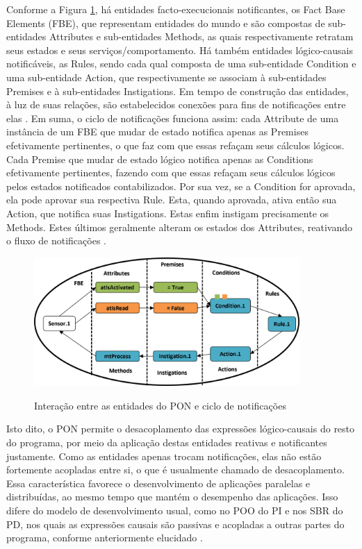 Conforme a Figura \ref{fig:oshiro_pon}, há entidades facto-execucionais
notificantes, os Fact Base Elements (FBE), que representam entidades do mundo e
são compostas de sub-entidades Attributes e sub-entidades Methods, as quais
respectivamente retratam seus estados e seus serviços/comportamento. Há também
entidades lógico-causais notificáveis, as Rules, sendo cada qual composta de uma
sub-entidade Condition e uma sub-entidade Action, que respectivamente se
associam à sub-entidades Premises e à sub-entidades Instigations. Em tempo de
construção das entidades, à luz de suas relações, são estabelecidos conexões
para fins de notificações entre elas \cite{doc_ronszcka_2019,oshiro_2021}. Em
suma, o ciclo de notificações funciona assim: cada Attribute de uma instância de
um FBE que mudar de estado notifica apenas as Premises efetivamente pertinentes,
o que faz com que essas refaçam seus cálculos lógicos. Cada Premise que mudar de
estado lógico notifica apenas as Conditions efetivamente pertinentes, fazendo
com que essas refaçam seus cálculos lógicos pelos estados notificados
contabilizados. Por sua vez, se a Condition for aprovada, ela pode aprovar sua
respectiva Rule. Esta, quando aprovada, ativa então sua Action, que notifica
suas Instigations. Estas enfim instigam precisamente os Methods. Estes últimos
geralmente alteram os estados dos Attributes, reativando o fluxo de notificações
\cite{doc_ronszcka_2019,oshiro_2021}.

\begin{figure}[!htb]
  \centering
  \caption{Interação entre as entidades do PON e ciclo de notificações}
  \includegraphics[width=0.9\textwidth]{../figures/nop_cycle.png}
  \smallskip
  \label{fig:oshiro_pon}
\end{figure}

Isto dito, o PON permite o desacoplamento das expressões lógico-causais do resto
do programa, por meio da aplicação destas entidades reativas e notificantes
justamente. Como as entidades apenas trocam notificações, elas não estão
fortemente acopladas entre si, o que é usualmente chamado de desacoplamento.
Essa característica favorece o desenvolvimento de aplicações paralelas e
distribuídas, ao mesmo tempo que mantém o desempenho das aplicações. Isso difere
do modelo de desenvolvimento usual, como no POO do PI e nos SBR do PD, nos quais
as expressões causais são passivas e acopladas a outras partes do programa,
conforme anteriormente elucidado
\cite{pat_simao_2008,simao_2009,msc_Banaszewski_2009,simao_2012a,doc_ronszcka_2019}.

